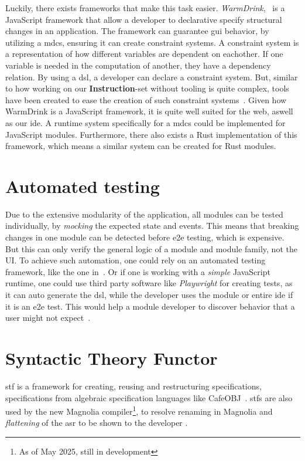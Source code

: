 Luckily, there exists frameworks that make this task easier.
\textit{WarmDrink},~\cite{warmDrink, dslMdcs} is a JavaScript framework that
allow a developer to declarative specify structural changes in an application.
The framework can guarantee \gls*{gui} behavior, by utilizing a \gls*{mdcs},
ensuring it can create constraint systems. A constraint system is a
representation of how different variables are dependent on eachother. If one
variable is needed in the computation of another, they have a dependency
relation. By using a \gls*{dsl}, a developer can declare a constraint system.
But, similar to how working on our \textbf{Instruction}-set without tooling is
quite complex, tools have been created to ease the creation of such constraint
systems~\cite{toolMcds}. Given how WarmDrink is a JavaScript framework, it is
quite well suited for the web, aswell as our \gls*{ide}. A runtime system
specifically for a \gls*{mdcs} could be implemented for JavaScript modules.
Furthermore, there also exists a Rust implementation of this framework, which
means a similar system can be created for Rust modules.

\section{Automated testing}

Due to the extensive modularity of the application, all modules can be tested
individually, by \textit{mocking} the expected state and events. This means that
breaking changes in one module can be detected before \gls*{e2e} testing, which
is expensive. But this can only verify the general logic of a module and module
family, not the UI. To achieve such automation, one could rely on an automated
testing framework, like the one in~\cite{autoUi}. Or if one is working with a
\textit{simple} JavaScript runtime, one could use third party software like
\textit{Playwright} for creating tests, as it can auto generate the \gls*{dsl},
while the developer uses the module or entire \gls*{ide} if it is an \gls*{e2e}
test. This would help a module developer to discover behavior that a user might
not expect~\cite{leastGui}.


\section{Syntactic Theory Functor}

\gls*{stf} is a framework for creating, reusing and restructuring
specifications\cite{stf:haveraaen:2020}, specifications from algebraic
specification languages like CafeOBJ~\cite{cafeObj}. \gls*{stf}s are also used
by the new Magnolia compiler\footnote{As of May 2025, still in development}, to
resolve renaming in Magnolia and \textit{flattening} of the \gls*{asr} to be
shown to the developer \cite{wiig}.


